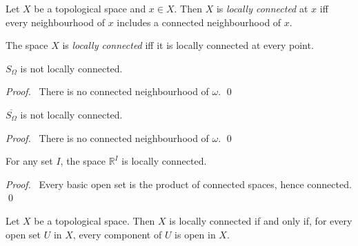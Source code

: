 \begin{df}
  Let $X$ be a topological space and $x \in X$. Then $X$ is \emph{locally
    connected} at $x$ iff every neighbourhood of $x$ includes a connected
  neighbourhood of $x$.

  The space $X$ is \emph{locally connected} iff it is locally connected at
  every point.
\end{df}

 \begin{prop}
$S_\Omega$ is not locally connected.
\end{prop}

\begin{proof}
\pf\ There is no connected neighbourhood of $\omega$. \qed
\end{proof}

   \begin{prop}
   $\overline{S_\Omega}$ is not locally connected.
\end{prop}

\begin{proof}
\pf\ There is no connected neighbourhood of $\omega$. \qed
\end{proof}

\begin{prop}
  For any set $I$,
  the space $\mathbb{R}^I$ is locally connected.
\end{prop}

\begin{proof}
  \pf\ Every basic open set is the product of connected spaces, hence
  connected. \qed
\end{proof}

\begin{prop}
  \label{prop:topology:locally_connected:component_open}
  Let $X$ be a topological space. Then $X$ is locally connected if and only
  if, for every open set $U$ in $X$, every component of $U$ is open in $X$.
\end{prop}

